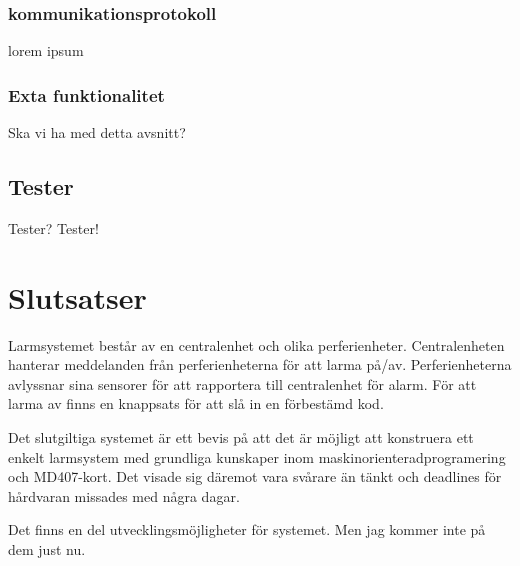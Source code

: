 \documentclass[a4paper]{article}
\begin{document}
\subsubsection{kommunikationsprotokoll}
lorem ipsum

\subsubsection{Exta funktionalitet}
Ska vi ha med detta avsnitt?

\subsection{Tester}
Tester? Tester!


\section{Slutsatser}
Larmsystemet består av en centralenhet och olika perferienheter. Centralenheten hanterar meddelanden från perferienheterna för att larma på/av. Perferienheterna avlyssnar sina sensorer för att rapportera till centralenhet för alarm. För att larma av finns en knappsats för att slå in en förbestämd kod. 



Det slutgiltiga systemet är ett bevis på att det är möjligt att konstruera ett enkelt larmsystem med grundliga kunskaper inom maskinorienteradprogramering och MD407-kort. Det visade sig däremot vara svårare än tänkt och deadlines för hårdvaran missades med några dagar. 

Det finns en del utvecklingsmöjligheter för systemet. Men jag kommer inte på dem just nu. 




\end{document}
